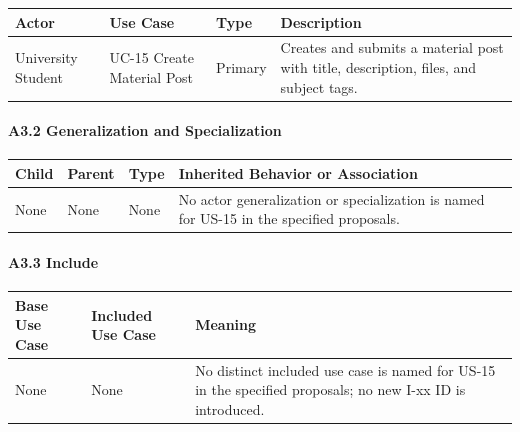 \documentclass[12pt]{article}
\renewcommand{\baselinestretch}{1.5}
\begin{document}
\begingroup
\small
\renewcommand{\baselinestretch}{1.0}\selectfont
\renewcommand{\arraystretch}{1.15}
\setlength{\tabcolsep}{6pt}
\begin{longtable}{|>{\raggedright\arraybackslash}p{}|>{\raggedright\arraybackslash}p{}|>{\raggedright\arraybackslash}p{}|>{\raggedright\arraybackslash}p{}|}
\hline
\textbf{Actor} & \textbf{Use Case} & \textbf{Type} & \textbf{Description} \\ \hline
\endhead
University Student & UC-15 Create Material Post & Primary & Creates and submits a material post with title, description, files, and subject tags. \\ \hline
\end{longtable}
\endgroup
\par\medskip

\hypertarget{sec:a3-2-generalization-and-specialization}{}
\paragraph*{A3.2 Generalization and Specialization}
\par\medskip

\begingroup
\small
\renewcommand{\baselinestretch}{1.0}\selectfont
\renewcommand{\arraystretch}{1.15}
\setlength{\tabcolsep}{6pt}
\begin{longtable}{|>{\raggedright\arraybackslash}p{}|>{\raggedright\arraybackslash}p{}|>{\raggedright\arraybackslash}p{}|>{\raggedright\arraybackslash}p{}|}
\hline
\textbf{Child} & \textbf{Parent} & \textbf{Type} & \textbf{Inherited Behavior or Association} \\ \hline
\endhead
None & None & None & No actor generalization or specialization is named for US-15 in the specified proposals. \\ \hline
\end{longtable}
\endgroup
\par\medskip

\hypertarget{sec:a3-3-include}{}
\paragraph*{A3.3 Include}
\par\medskip

\begingroup
\small
\renewcommand{\baselinestretch}{1.0}\selectfont
\renewcommand{\arraystretch}{1.15}
\setlength{\tabcolsep}{6pt}
\begin{longtable}{|>{\raggedright\arraybackslash}p{}|>{\raggedright\arraybackslash}p{}|>{\raggedright\arraybackslash}p{}|}
\hline
\textbf{Base Use Case} & \textbf{Included Use Case} & \textbf{Meaning} \\ \hline
\endhead
None & None & No distinct included use case is named for US-15 in the specified proposals; no new I-xx ID is introduced. \\ \hline
\end{longtable}
\endgroup
\par\medskip
\end{document}
